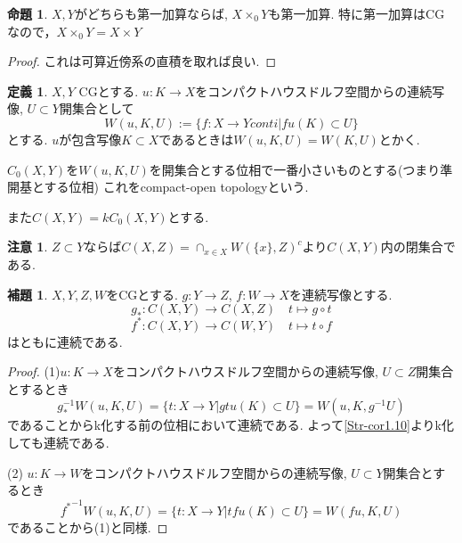 \documentclass[dvipdfmx,a4paper,11pt]{article}
\theoremstyle{definition}
\newtheorem{lem}[thm]{補題}
\newtheorem{prop}[thm]{命題}
\newtheorem{dfn}[thm]{定義}
\newtheorem{rem}[thm]{注意}
\begin{document}
 \begin{tcolorbox}
 [colback = white, colframe = green!35!black, fonttitle = \bfseries,breakable = true]
\begin{prop}\cite[Prop2.7]{Str}
$X,Y$がどちらも第一加算ならば, $X \times_0 Y$も第一加算.
特に第一加算はCGなので，$X \times_0 Y = X \times Y$
\end{prop}
\end{tcolorbox}
\begin{proof}
これは可算近傍系の直積を取れば良い.
\end{proof}

 \begin{tcolorbox}
 [colback = white, colframe = green!35!black, fonttitle = \bfseries,breakable = true]
\begin{dfn}\cite[Def 2.8]{Str}
$X,Y$ CGとする.
$u : K \to X$をコンパクトハウスドルフ空間からの連続写像, $U \subset Y$開集合として
$$
W(u,K,U)
:=
\{f : X \to Y conti | fu(K) \subset U \}
$$
とする. 
$u$が包含写像$K \subset X$であるときは$W(u,K,U) = W(K,U)$とかく.

$C_0(X,Y)$を$W(u,K,U)$を開集合とする位相で一番小さいものとする(つまり準開基とする位相)
これをcompact-open topologyという.

また$C(X,Y) = kC_0(X,Y)$とする.
\end{dfn}
\end{tcolorbox}

\begin{rem}
$Z \subset Y$ならば$C(X,Z) =\cap_{x \in X} W(\{ x\},Z)^c$より$C(X,Y)$内の閉集合である.
\end{rem}

 \begin{tcolorbox}
 [colback = white, colframe = green!35!black, fonttitle = \bfseries,breakable = true]
\begin{lem}\cite[Lemma 2.10]{Str}
$X,Y,Z,W$をCGとする. 
$g : Y \to Z$, $f : W\to X$を連続写像とする. 
$$
g_{*} : C(X,Y) \to C(X,Z) \quad t \mapsto g \circ t
$$
$$
f^{*} : C(X,Y) \to C(W,Y) \quad t \mapsto t \circ f
$$
はともに連続である.
\end{lem}
\end{tcolorbox}

\begin{proof}
(1)$u : K \to X$をコンパクトハウスドルフ空間からの連続写像, $U \subset Z$開集合とするとき
$$
g_{*}^{-1}W(u,K,U)
=\{ t : X \to Y | gtu(K) \subset U\}
=W(u,K,g^{-1}U)
$$
であることからk化する前の位相において連続である.
よって\ref{Str-cor1.10}よりk化しても連続である. 

(2) $u : K \to W$をコンパクトハウスドルフ空間からの連続写像, $U \subset Y$開集合とするとき
$$
{f^{*}}^{-1}W(u,K,U)
=\{ t : X \to Y | tfu(K) \subset U\}
=W(fu,K,U)
$$
であることから(1)と同様. 
\end{proof}
\end{document}
